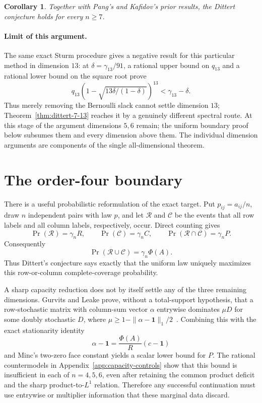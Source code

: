 \documentclass[10pt,a4paper]{amsart}
\newtheorem{corollary}[theorem]{Corollary}
\theoremstyle{definition}
\theoremstyle{remark}
\begin{document}
\begin{corollary}
Together with Pang's and Kafidov's prior results, the Dittert conjecture
holds for every \(n\geq7\).
\end{corollary}

\paragraph{Limit of this argument.}
The same exact Sturm procedure gives a negative result for this particular
method in dimension \(13\):
at \(\delta=\gamma_{13}/91\), a rational upper bound on \(q_{13}\) and a
rational lower bound on the square root prove
\[
q_{13}(1-\sqrt{13\delta/(1-\delta)})^{13}
 <\gamma_{13}-\delta.
\]
Thus merely removing the Bernoulli slack cannot settle dimension \(13\);
Theorem~\ref{thm:dittert-7-13} reaches it by a genuinely different
spectral route. At this stage of the argument dimensions \(5,6\) remain;
the uniform boundary proof below subsumes them and every dimension above
them. The individual dimension arguments are components of the single
all-dimensional theorem.


\section{The order-four boundary}\label{sec:n4}

There is a useful probabilistic reformulation of the exact target.  Put
\(p_{ij}=a_{ij}/n\), draw \(n\) independent pairs with law \(p\), and let
\(\mathcal R\) and \(\mathcal C\) be the events that all row labels and all
column labels, respectively, occur.  Direct counting gives
\[
 \Pr(\mathcal R)=\gamma_nR,\qquad
 \Pr(\mathcal C)=\gamma_nC,\qquad
 \Pr(\mathcal R\cap\mathcal C)=\gamma_nP.
\]
Consequently
\[
 \Pr(\mathcal R\cup\mathcal C)=\gamma_n\Phi(A).
\]
Thus Dittert's conjecture says exactly that the uniform law uniquely
maximizes this row-or-column complete-coverage probability.

A sharp capacity reduction does not by itself settle any of the three
remaining dimensions.  Gurvits and Leake prove, without a total-support
hypothesis, that a row-stochastic matrix with column-sum vector \(\alpha\)
entrywise dominates \(\mu D\) for some doubly stochastic \(D\), where
\(\mu\geq1-\|\alpha-\mathbf1\|_1/2\)~\cite[Theorem 5.5]{GL}.
Combining this with the exact stationarity identity
\[
 \alpha-\mathbf1=\frac{\Phi(A)}R(c-\mathbf1)
\]
and Minc's two-zero face constant yields a scalar lower bound for \(P\).
The rational countermodels in Appendix~\ref{app:capacity-controls} show that
this bound is insufficient in each of \(n=4,5,6\), even after retaining the
common product deficit and the sharp product-to-\(L^1\) relation.  Therefore
any successful continuation must use entrywise or multiplier information
that these marginal data discard.
\end{document}
